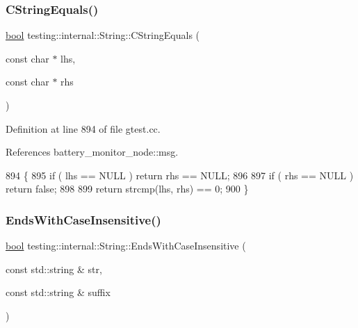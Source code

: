 \subsubsection{\texorpdfstring{C\+String\+Equals()}{CStringEquals()}}
{\footnotesize\ttfamily \hyperlink{classbool}{bool} testing\+::internal\+::\+String\+::\+C\+String\+Equals (\begin{DoxyParamCaption}\item[{const char $\ast$}]{lhs,  }\item[{const char $\ast$}]{rhs }\end{DoxyParamCaption})\hspace{0.3cm}{\ttfamily [static]}}



Definition at line 894 of file gtest.\+cc.



References battery\+\_\+monitor\+\_\+node\+::msg.


\begin{DoxyCode}
894                                                              \{
895   \textcolor{keywordflow}{if} ( lhs == NULL ) \textcolor{keywordflow}{return} rhs == NULL;
896 
897   \textcolor{keywordflow}{if} ( rhs == NULL ) \textcolor{keywordflow}{return} \textcolor{keyword}{false};
898 
899   \textcolor{keywordflow}{return} strcmp(lhs, rhs) == 0;
900 \}
\end{DoxyCode}
\mbox{\label{classtesting_1_1internal_1_1String_a968f242b709f8c7c0ed5ecf246553321}} 
\subsubsection{\texorpdfstring{Ends\+With\+Case\+Insensitive()}{EndsWithCaseInsensitive()}}
{\footnotesize\ttfamily \hyperlink{classbool}{bool} testing\+::internal\+::\+String\+::\+Ends\+With\+Case\+Insensitive (\begin{DoxyParamCaption}\item[{const std\+::string \&}]{str,  }\item[{const std\+::string \&}]{suffix }\end{DoxyParamCaption})\hspace{0.3cm}{\ttfamily [static]}}



